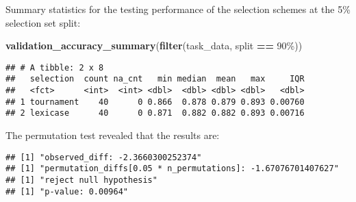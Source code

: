 \documentclass[
]{book}
\newenvironment{Shaded}{\begin{snugshade}}{\end{snugshade}}
\newcommand{\AttributeTok}[1]{\textcolor[rgb]{0.13,0.29,0.53}{#1}}
\newcommand{\DecValTok}[1]{\textcolor[rgb]{0.00,0.00,0.81}{#1}}
\newcommand{\FunctionTok}[1]{\textcolor[rgb]{0.13,0.29,0.53}{\textbf{#1}}}
\newcommand{\NormalTok}[1]{#1}
\newcommand{\OtherTok}[1]{\textcolor[rgb]{0.56,0.35,0.01}{#1}}
\newcommand{\SpecialCharTok}[1]{\textcolor[rgb]{0.81,0.36,0.00}{\textbf{#1}}}
\newcommand{\StringTok}[1]{\textcolor[rgb]{0.31,0.60,0.02}{#1}}
\begin{document}
Summary statistics for the testing performance of the selection schemes at the 5\% selection set split:

\begin{Shaded}
\begin{Highlighting}[]
\FunctionTok{validation\_accuracy\_summary}\NormalTok{(}\FunctionTok{filter}\NormalTok{(task\_data, split }\SpecialCharTok{==} \StringTok{\textquotesingle{}90\%\textquotesingle{}}\NormalTok{))}
\end{Highlighting}
\end{Shaded}

\begin{verbatim}
## # A tibble: 2 x 8
##   selection  count na_cnt   min median  mean   max     IQR
##   <fct>      <int>  <int> <dbl>  <dbl> <dbl> <dbl>   <dbl>
## 1 tournament    40      0 0.866  0.878 0.879 0.893 0.00760
## 2 lexicase      40      0 0.871  0.882 0.882 0.893 0.00716
\end{verbatim}

The permutation test revealed that the results are:

\begin{Shaded}
\end{Shaded}

\begin{verbatim}
## [1] "observed_diff: -2.3660300252374"
## [1] "permutation_diffs[0.05 * n_permutations]: -1.67076701407627"
## [1] "reject null hypothesis"
## [1] "p-value: 0.00964"
\end{verbatim}
\end{document}
